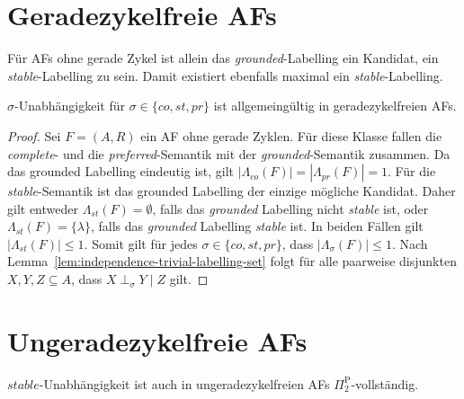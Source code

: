 \section{Geradezykelfreie AFs}
\label{sec:even-cycle-free-afs}

Für AFs ohne gerade Zykel ist allein das \emph{grounded}-Labelling ein Kandidat, ein \emph{stable}-Labelling zu sein. 
Damit existiert ebenfalls maximal ein \emph{stable}-Labelling. 

\begin{Proposition}
\label{prop:even-cycle-free-af-ci-st-top}
    \(\sigma\)-Unabhängigkeit für \(\sigma \in \{co,st,pr\}\) ist allgemeingültig in geradezykelfreien AFs.
\end{Proposition}

\begin{proof}
\label{even-cycle-free-af-ci-top-true}
    Sei \(F=(A,R)\) ein AF ohne gerade Zyklen. Für diese Klasse fallen die \emph{complete}- und die \emph{preferred}-Semantik mit der \emph{grounded}-Semantik zusammen. 
    Da das grounded Labelling eindeutig ist, gilt \(|\Lambda_{co}(F)|= |\Lambda_{pr}(F)|=1\).
    Für die \emph{stable}-Semantik ist das grounded Labelling der einzige mögliche Kandidat. 
    Daher gilt entweder \(\Lambda_{st}(F)=\emptyset\), falls das \emph{grounded }Labelling nicht \emph{stable} ist, oder \(\Lambda_{st}(F)=\{\lambda\}\), 
    falls das \emph{grounded} Labelling \emph{stable} ist. In beiden Fällen gilt \(|\Lambda_{st}(F)| \leq 1\).
    Somit gilt für jedes \(\sigma \in \{co,st,pr\}\), dass \(|\Lambda_\sigma(F)| \leq 1\). 
    Nach Lemma~\ref{lem:independence-trivial-labelling-set} folgt für alle paarweise disjunkten \(X,Y,Z \subseteq A\), dass \(X \perp_\sigma Y \mid Z\) gilt.
\end{proof}


\section{Ungeradezykelfreie AFs}
\label{sec:odd-cycle-free-afs}

\begin{Proposition}
    \label{prop:ocf-af-ci-st-pi^2}
    \(stable\)-Unabhängigkeit ist auch in ungeradezykelfreien AFs \(\Pi_2^\text{P}\)-vollständig.
\end{Proposition}

